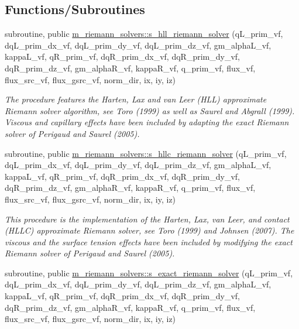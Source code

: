 \subsection*{Functions/\+Subroutines}
\begin{DoxyCompactItemize}
\item 
subroutine, public \hyperlink{namespacem__riemann__solvers_a3062ef97dfec8673afd80dcbee6e3814}{m\+\_\+riemann\+\_\+solvers\+::s\+\_\+hll\+\_\+riemann\+\_\+solver} (q\+L\+\_\+prim\+\_\+vf, dq\+L\+\_\+prim\+\_\+dx\+\_\+vf, dq\+L\+\_\+prim\+\_\+dy\+\_\+vf, dq\+L\+\_\+prim\+\_\+dz\+\_\+vf, gm\+\_\+alpha\+L\+\_\+vf, kappa\+L\+\_\+vf, q\+R\+\_\+prim\+\_\+vf, dq\+R\+\_\+prim\+\_\+dx\+\_\+vf, dq\+R\+\_\+prim\+\_\+dy\+\_\+vf, dq\+R\+\_\+prim\+\_\+dz\+\_\+vf, gm\+\_\+alpha\+R\+\_\+vf, kappa\+R\+\_\+vf, q\+\_\+prim\+\_\+vf, flux\+\_\+vf, flux\+\_\+src\+\_\+vf, flux\+\_\+gsrc\+\_\+vf, norm\+\_\+dir, ix, iy, iz)
\begin{DoxyCompactList}\small\item\em The procedure features the Harten, Lax and van Leer (H\+LL) approximate Riemann solver algorithm, see Toro (1999) as well as Saurel and Abgrall (1999). Viscous and capillary effects have been included by adapting the exact Riemann solver of Perigaud and Saurel (2005). \end{DoxyCompactList}\item 
subroutine, public \hyperlink{namespacem__riemann__solvers_ae2ad588d58b624a8320805f3860a3eb8}{m\+\_\+riemann\+\_\+solvers\+::s\+\_\+hllc\+\_\+riemann\+\_\+solver} (q\+L\+\_\+prim\+\_\+vf, dq\+L\+\_\+prim\+\_\+dx\+\_\+vf, dq\+L\+\_\+prim\+\_\+dy\+\_\+vf, dq\+L\+\_\+prim\+\_\+dz\+\_\+vf, gm\+\_\+alpha\+L\+\_\+vf, kappa\+L\+\_\+vf, q\+R\+\_\+prim\+\_\+vf, dq\+R\+\_\+prim\+\_\+dx\+\_\+vf, dq\+R\+\_\+prim\+\_\+dy\+\_\+vf, dq\+R\+\_\+prim\+\_\+dz\+\_\+vf, gm\+\_\+alpha\+R\+\_\+vf, kappa\+R\+\_\+vf, q\+\_\+prim\+\_\+vf, flux\+\_\+vf, flux\+\_\+src\+\_\+vf, flux\+\_\+gsrc\+\_\+vf, norm\+\_\+dir, ix, iy, iz)
\begin{DoxyCompactList}\small\item\em This procedure is the implementation of the Harten, Lax, van Leer, and contact (H\+L\+LC) approximate Riemann solver, see Toro (1999) and Johnsen (2007). The viscous and the surface tension effects have been included by modifying the exact Riemann solver of Perigaud and Saurel (2005). \end{DoxyCompactList}\item 
subroutine, public \hyperlink{namespacem__riemann__solvers_a9fa393b97819b253e8b85f0444a15c27}{m\+\_\+riemann\+\_\+solvers\+::s\+\_\+exact\+\_\+riemann\+\_\+solver} (q\+L\+\_\+prim\+\_\+vf, dq\+L\+\_\+prim\+\_\+dx\+\_\+vf, dq\+L\+\_\+prim\+\_\+dy\+\_\+vf, dq\+L\+\_\+prim\+\_\+dz\+\_\+vf, gm\+\_\+alpha\+L\+\_\+vf, kappa\+L\+\_\+vf, q\+R\+\_\+prim\+\_\+vf, dq\+R\+\_\+prim\+\_\+dx\+\_\+vf, dq\+R\+\_\+prim\+\_\+dy\+\_\+vf, dq\+R\+\_\+prim\+\_\+dz\+\_\+vf, gm\+\_\+alpha\+R\+\_\+vf, kappa\+R\+\_\+vf, q\+\_\+prim\+\_\+vf, flux\+\_\+vf, flux\+\_\+src\+\_\+vf, flux\+\_\+gsrc\+\_\+vf, norm\+\_\+dir, ix, iy, iz)

\end{DoxyCompactItemize}
